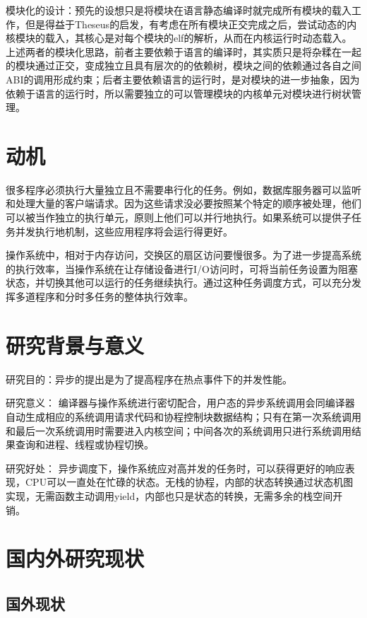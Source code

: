 模块化的设计：预先的设想只是将模块在语言静态编译时就完成所有模块的载入工作，但是得益于Theseus的启发，有考虑在所有模块正交完成之后，尝试动态的内核模块的载入，其核心是对每个模块的elf的解析，从而在内核运行时动态载入。上述两者的模块化思路，前者主要依赖于语言的编译时，其实质只是将杂糅在一起的模块通过正交，变成独立且具有层次的的依赖树，模块之间的依赖通过各自之间ABI的调用形成约束；后者主要依赖语言的运行时，是对模块的进一步抽象，因为依赖于语言的运行时，所以需要独立的可以管理模块的内核单元对模块进行树状管理。


\section{动机}

很多程序必须执行大量独立且不需要串行化的任务。例如，数据库服务器可以监听和处理大量的客户端请求。因为这些请求没必要按照某个特定的顺序被处理，他们可以被当作独立的执行单元，原则上他们可以并行地执行。如果系统可以提供子任务并发执行地机制，这些应用程序将会运行得更好。

操作系统中，相对于内存访问，交换区的扇区访问要慢很多。为了进一步提高系统的执行效率，当操作系统在让存储设备进行I/O访问时，可将当前任务设置为阻塞状态，并切换其他可以运行的任务继续执行。通过这种任务调度方式，可以充分发挥多道程序和分时多任务的整体执行效率。


\section{研究背景与意义}

研究目的：异步的提出是为了提高程序在热点事件下的并发性能。

研究意义： 编译器与操作系统进行密切配合，用户态的异步系统调用会同编译器自动生成相应的系统调用请求代码和协程控制块数据结构；只有在第一次系统调用和最后一次系统调用时需要进入内核空间；中间各次的系统调用只进行系统调用结果查询和进程、线程或协程切换。

研究好处： 异步调度下，操作系统应对高并发的任务时，可以获得更好的响应表现，CPU可以一直处在忙碌的状态。无栈的协程，内部的状态转换通过状态机图实现，无需函数主动调用yield，内部也只是状态的转换，无需多余的栈空间开销。

\section{国内外研究现状}

\subsection{国外现状}

